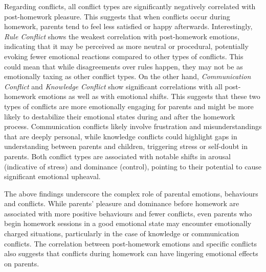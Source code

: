 Regarding conflicts, all conflict types are significantly negatively correlated with post-homework pleasure. This suggests that when conflicts occur during homework, parents tend to feel less satisfied or happy afterwards. Interestingly, \textit{Rule Conflict} shows the weakest correlation with post-homework emotions, indicating that it may be perceived as more neutral or procedural, potentially evoking fewer emotional reactions compared to other types of conflicts. This could mean that while disagreements over rules happen, they may not be as emotionally taxing as other conflict types.
On the other hand, \textit{Communication Conflict} and \textit{Knowledge Conflict} show significant correlations with all post-homework emotions as well as with emotional shifts. This suggests that these two types of conflicts are more emotionally engaging for parents and might be more likely to destabilize their emotional states during and after the homework process. Communication conflicts likely involve frustration and misunderstandings that are deeply personal, while knowledge conflicts could highlight gaps in understanding between parents and children, triggering stress or self-doubt in parents. Both conflict types are associated with notable shifts in arousal (indicative of stress) and dominance (control), pointing to their potential to cause significant emotional upheaval.


The above findings underscore the complex role of parental emotions, behaviours and conflicts. While parents' pleasure and dominance before homework are associated with more positive behaviours and fewer conflicts, even parents who begin homework sessions in a good emotional state may encounter emotionally charged situations, particularly in the case of knowledge or communication conflicts. The correlation between post-homework emotions and specific conflicts also suggests that conflicts during homework can have lingering emotional effects on parents.
